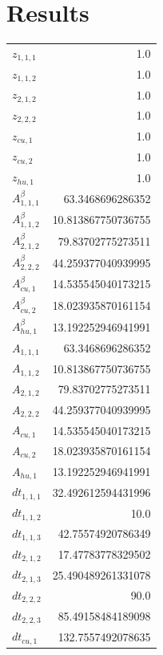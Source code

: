 \documentclass{article}%
\makeatletter
\let\mcnewpage=\newpage%
\newcommand{\TrickSupertabularIntoMulticols}{%
\renewcommand\newpage{%
\if@firstcolumn%
\hrule width\linewidth height0pt%
\columnbreak%
\else%
\mcnewpage%
\fi%
}%
}%
\makeatother
\begin{document}
\section{Results}%
\thispagestyle{plain}%
\begin{multicols*}{3}%
\TrickSupertabularIntoMulticols%
%
\begin{supertabular}{lr}%
	$z_{1,1,1}$ & 1.0 \\%
	$z_{1,1,2}$ & 1.0 \\%
	$z_{2,1,2}$ & 1.0 \\%
	$z_{2,2,2}$ & 1.0 \\%
	$z_{cu,1}$ & 1.0 \\%
	$z_{cu,2}$ & 1.0 \\%
	$z_{hu,1}$ & 1.0 \\%
	$A_{1,1,1}^{\beta}$ & 63.3468696286352 \\%
	$A_{1,1,2}^{\beta}$ & 10.813867750736755 \\%
	$A_{2,1,2}^{\beta}$ & 79.83702775273511 \\%
	$A_{2,2,2}^{\beta}$ & 44.259377040939995 \\%
	$A_{cu,1}^{\beta}$ & 14.535545040173215 \\%
	$A_{cu,2}^{\beta}$ & 18.023935870161154 \\%
	$A_{hu,1}^{\beta}$ & 13.192252946941991 \\%
	$A_{1,1,1}$ & 63.3468696286352 \\%
	$A_{1,1,2}$ & 10.813867750736755 \\%
	$A_{2,1,2}$ & 79.83702775273511 \\%
	$A_{2,2,2}$ & 44.259377040939995 \\%
	$A_{cu,1}$ & 14.535545040173215 \\%
	$A_{cu,2}$ & 18.023935870161154 \\%
	$A_{hu,1}$ & 13.192252946941991 \\%
	$dt_{1,1,1}$ & 32.492612594431996 \\%
	$dt_{1,1,2}$ & 10.0 \\%
	$dt_{1,1,3}$ & 42.75574920786349 \\%
	$dt_{2,1,2}$ & 17.47783778329502 \\%
	$dt_{2,1,3}$ & 25.490489261331078 \\%
	$dt_{2,2,2}$ & 90.0 \\%
	$dt_{2,2,3}$ & 85.49158484189098 \\%
	$dt_{cu,1}$ & 132.7557492078635 \\%

\end{supertabular}
\end{multicols*}
\end{document}
